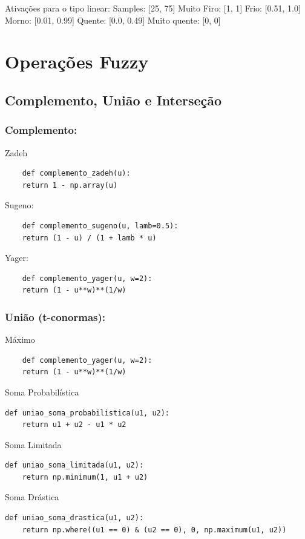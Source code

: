 \documentclass[a4paper,12pt]{article}
\begin{document}
Ativações para o tipo linear:
Samples: [25, 75]
Muito Firo: [1, 1]
Frio: [0.51, 1.0]
Morno: [0.01, 0.99]
Quente: [0.0, 0.49]
Muito quente: [0, 0]



\section{Operações Fuzzy}

\subsection{Complemento, União e Interseção}

\subsubsection{Complemento:}

Zadeh
\begin{verbatim}    
    def complemento_zadeh(u):
    return 1 - np.array(u)
\end{verbatim}

Sugeno:
\begin{verbatim}    
    def complemento_sugeno(u, lamb=0.5):
    return (1 - u) / (1 + lamb * u)
\end{verbatim}


Yager:
\begin{verbatim}    
    def complemento_yager(u, w=2):
    return (1 - u**w)**(1/w)
\end{verbatim}

\subsubsection{União (t-conormas):}
Máximo
\begin{verbatim}    
    def complemento_yager(u, w=2):
    return (1 - u**w)**(1/w)
\end{verbatim}

Soma Probabilística
\begin{verbatim}
def uniao_soma_probabilistica(u1, u2):
    return u1 + u2 - u1 * u2
\end{verbatim}


Soma Limitada
\begin{verbatim}
def uniao_soma_limitada(u1, u2):
    return np.minimum(1, u1 + u2)
\end{verbatim}

Soma Drástica
\begin{verbatim}
def uniao_soma_drastica(u1, u2):
    return np.where((u1 == 0) & (u2 == 0), 0, np.maximum(u1, u2))
\end{verbatim}
\end{document}

